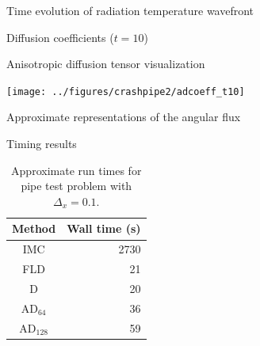 \documentclass{beamer}
\begin{document}
\begin{frame}{Time evolution of radiation temperature wavefront}

  \centering%
  \par
\end{frame}
\begin{frame}{Diffusion coefficients ($t=10$)}
  
  \centering\small%
  \par
\end{frame}
\begin{frame}{Anisotropic diffusion tensor visualization}
  
  \centering%
  \texttt{[image: ../figures/crashpipe2/adcoeff\_t10]}%
  \par
\end{frame}
\begin{frame}{Approximate representations of the angular flux}
  
  \centering\small%
  \par
\end{frame}
\begin{frame}{Timing results}
  \begin{table}[htb]
    \centering
    \begin{tabular}{cr}
      Method & Wall time (s) \\ \hline
      IMC & 2730 \\
      FLD & 21 \\
      D   & 20 \\
      AD$_{64}$ & 36 \\
      AD$_{128}$ & 59
    \end{tabular}
    \caption{Approximate run times for pipe test problem with $\Delta_x=0.1$.}
    \label{tab:pipeTiming}
  \end{table}
\end{frame}

\end{document}

